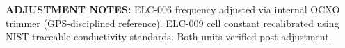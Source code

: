 \vspace{2pt}
\noindent\textcolor{NexaGold}{\scriptsize\faWrench\; \textbf{ADJUSTMENT NOTES:} ELC-006 frequency adjusted via internal OCXO trimmer (GPS-disciplined reference). ELC-009 cell constant recalibrated using NIST-traceable conductivity standards. Both units verified post-adjustment.}

\vspace{6pt}
